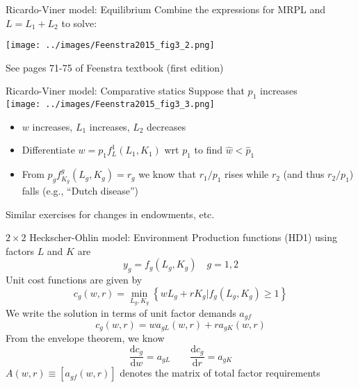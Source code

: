 \documentclass[10pt,notes=hide]{beamer}
\begin{document}
\begin{frame}{Ricardo-Viner model: Equilibrium}
Combine the expressions for MRPL and $L = L_1 + L_2$ to solve:
\begin{center}\texttt{[image: ../images/Feenstra2015\_fig3\_2.png]}\end{center}
See pages 71-75 of Feenstra textbook (first edition)
\end{frame}
\begin{frame}{Ricardo-Viner model: Comparative statics}
Suppose that $p_1$ increases
\\ %
\texttt{[image: ../images/Feenstra2015\_fig3\_3.png]}
\begin{itemize}
	\item $w$ increases, $L_1$ increases, $L_2$ decreases
	\item Differentiate $w=p_1 f^1_{L} \left(L_1,K_1\right)$ wrt $p_1$ to find $\hat{w}<\hat{p}_1$
	\item From $p_g f^g_{K_g}\left(L_g,K_g\right) = r_g $ we know that $r_1/p_1$ rises while $r_2$ (and thus $r_2/p_1$) falls (e.g., ``Dutch disease'')
\end{itemize}
Similar exercises for changes in endowments, etc.
\end{frame}
\begin{frame}{$2 \times 2$ Heckscher-Ohlin model: Environment}
Production functions (HD1) using factors $L$ and $K$ are
\begin{equation*}
y_{g}=f_{g}\left( L_{g},K_{g}\right) \quad g=1,2
\end{equation*}
Unit cost functions are given by
\begin{equation*}
c_{g}\left( w,r\right) =\min_{L_{g},K_{g}}\left\{ wL_{g}+rK_{g}|f_{g}\left(
L_{g},K_{g}\right) \geq 1\right\}
\end{equation*}
We write the solution in terms of unit factor demands $a_{gf}$
\begin{equation*}
c_{g}\left( w,r\right) =wa_{gL}\left( w,r\right) +ra_{gK}\left( w,r\right)
\end{equation*}
From the envelope theorem, we know
\begin{equation*}
\frac{\textrm{d} c_{g}}{\textrm{d} w}=a_{gL} \qquad \frac{\textrm{d} c_{g}}{\textrm{d} r}=a_{gK}
\end{equation*}
$A(w,r)\equiv [a_{gf}(w,r)]$ denotes the matrix of total factor requirements
\end{frame}
\end{document}
